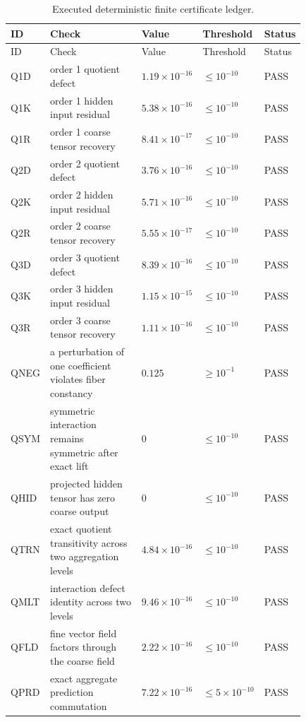 \begin{longtable}{@{}p{0.08\linewidth}p{0.43\linewidth}p{0.12\linewidth}p{0.12\linewidth}p{0.08\linewidth}@{}}
\caption{Executed deterministic finite certificate ledger.}\label{PRIQ:tab:executed-ledger}\\
\toprule
ID & Check & Value & Threshold & Status\\
\midrule
\endfirsthead
\toprule
ID & Check & Value & Threshold & Status\\
\midrule
\endhead
Q1D & order 1 quotient defect & $1.19\times 10^{-16}$ & $\leq 10^{-10}$ & PASS\\
Q1K & order 1 hidden input residual & $5.38\times 10^{-16}$ & $\leq 10^{-10}$ & PASS\\
Q1R & order 1 coarse tensor recovery & $8.41\times 10^{-17}$ & $\leq 10^{-10}$ & PASS\\
Q2D & order 2 quotient defect & $3.76\times 10^{-16}$ & $\leq 10^{-10}$ & PASS\\
Q2K & order 2 hidden input residual & $5.71\times 10^{-16}$ & $\leq 10^{-10}$ & PASS\\
Q2R & order 2 coarse tensor recovery & $5.55\times 10^{-17}$ & $\leq 10^{-10}$ & PASS\\
Q3D & order 3 quotient defect & $8.39\times 10^{-16}$ & $\leq 10^{-10}$ & PASS\\
Q3K & order 3 hidden input residual & $1.15\times 10^{-15}$ & $\leq 10^{-10}$ & PASS\\
Q3R & order 3 coarse tensor recovery & $1.11\times 10^{-16}$ & $\leq 10^{-10}$ & PASS\\
QNEG & a perturbation of one coefficient violates fiber constancy & $0.125$ & $\geq 10^{-1}$ & PASS\\
QSYM & symmetric interaction remains symmetric after exact lift & $0$ & $\leq 10^{-10}$ & PASS\\
QHID & projected hidden tensor has zero coarse output & $0$ & $\leq 10^{-10}$ & PASS\\
QTRN & exact quotient transitivity across two aggregation levels & $4.84\times 10^{-16}$ & $\leq 10^{-10}$ & PASS\\
QMLT & interaction defect identity across two levels & $9.46\times 10^{-16}$ & $\leq 10^{-10}$ & PASS\\
QFLD & fine vector field factors through the coarse field & $2.22\times 10^{-16}$ & $\leq 10^{-10}$ & PASS\\
QPRD & exact aggregate prediction commutation & $7.22\times 10^{-16}$ & $\leq 5\times 10^{-10}$ & PASS\\

\end{longtable}
